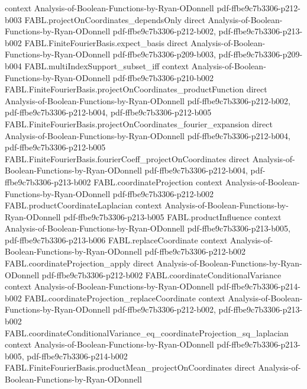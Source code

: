 \begin{theorem}
  {context}
  {Analysis-of-Boolean-Functions-by-Ryan-ODonnell}
  {pdf-ffbe9c7b3306-p212-b003}
\proofstep
  {FABL.projectOnCoordinates_dependsOnly}
  {direct}
  {Analysis-of-Boolean-Functions-by-Ryan-ODonnell}
  {pdf-ffbe9c7b3306-p212-b002,
    pdf-ffbe9c7b3306-p213-b002}
\proofstep
  {FABL.FiniteFourierBasis.expect_basis}
  {direct}
  {Analysis-of-Boolean-Functions-by-Ryan-ODonnell}
  {pdf-ffbe9c7b3306-p209-b003,
    pdf-ffbe9c7b3306-p209-b004}
\proofstep
  {FABL.multiIndexSupport_subset_iff}
  {context}
  {Analysis-of-Boolean-Functions-by-Ryan-ODonnell}
  {pdf-ffbe9c7b3306-p210-b002}
\proofstep
  {FABL.FiniteFourierBasis.projectOnCoordinates_productFunction}
  {direct}
  {Analysis-of-Boolean-Functions-by-Ryan-ODonnell}
  {pdf-ffbe9c7b3306-p212-b002,
    pdf-ffbe9c7b3306-p212-b004,
    pdf-ffbe9c7b3306-p212-b005}
\proofstep
  {FABL.FiniteFourierBasis.projectOnCoordinates_fourier_expansion}
  {direct}
  {Analysis-of-Boolean-Functions-by-Ryan-ODonnell}
  {pdf-ffbe9c7b3306-p212-b004,
    pdf-ffbe9c7b3306-p212-b005}
\proofstep
  {FABL.FiniteFourierBasis.fourierCoeff_projectOnCoordinates}
  {direct}
  {Analysis-of-Boolean-Functions-by-Ryan-ODonnell}
  {pdf-ffbe9c7b3306-p212-b004,
    pdf-ffbe9c7b3306-p213-b002}
\proofstep
  {FABL.coordinateProjection}
  {context}
  {Analysis-of-Boolean-Functions-by-Ryan-ODonnell}
  {pdf-ffbe9c7b3306-p212-b002}
\proofstep
  {FABL.productCoordinateLaplacian}
  {context}
  {Analysis-of-Boolean-Functions-by-Ryan-ODonnell}
  {pdf-ffbe9c7b3306-p213-b005}
\proofstep
  {FABL.productInfluence}
  {context}
  {Analysis-of-Boolean-Functions-by-Ryan-ODonnell}
  {pdf-ffbe9c7b3306-p213-b005,
    pdf-ffbe9c7b3306-p213-b006}
\proofstep
  {FABL.replaceCoordinate}
  {context}
  {Analysis-of-Boolean-Functions-by-Ryan-ODonnell}
  {pdf-ffbe9c7b3306-p212-b002}
\proofstep
  {FABL.coordinateProjection_apply}
  {direct}
  {Analysis-of-Boolean-Functions-by-Ryan-ODonnell}
  {pdf-ffbe9c7b3306-p212-b002}
\proofstep
  {FABL.coordinateConditionalVariance}
  {context}
  {Analysis-of-Boolean-Functions-by-Ryan-ODonnell}
  {pdf-ffbe9c7b3306-p214-b002}
\proofstep
  {FABL.coordinateProjection_replaceCoordinate}
  {context}
  {Analysis-of-Boolean-Functions-by-Ryan-ODonnell}
  {pdf-ffbe9c7b3306-p212-b002,
    pdf-ffbe9c7b3306-p213-b002}
\proofstep
  {FABL.coordinateConditionalVariance_eq_coordinateProjection_sq_laplacian}
  {context}
  {Analysis-of-Boolean-Functions-by-Ryan-ODonnell}
  {pdf-ffbe9c7b3306-p213-b005,
    pdf-ffbe9c7b3306-p214-b002}
\proofstep
  {FABL.FiniteFourierBasis.productMean_projectOnCoordinates}
  {direct}
  {Analysis-of-Boolean-Functions-by-Ryan-ODonnell}

\end{theorem}
